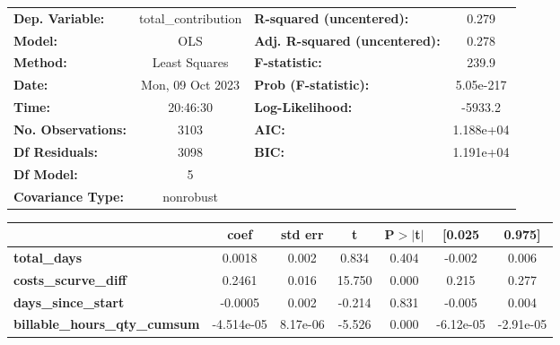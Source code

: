 \begin{center}
\begin{tabular}{lclc}
\toprule
\textbf{Dep. Variable:}               & total\_contribution & \textbf{  R-squared (uncentered):}      &     0.279   \\
\textbf{Model:}                       &         OLS         & \textbf{  Adj. R-squared (uncentered):} &     0.278   \\
\textbf{Method:}                      &    Least Squares    & \textbf{  F-statistic:       }          &     239.9   \\
\textbf{Date:}                        &   Mon, 09 Oct 2023  & \textbf{  Prob (F-statistic):}          & 5.05e-217   \\
\textbf{Time:}                        &       20:46:30      & \textbf{  Log-Likelihood:    }          &   -5933.2   \\
\textbf{No. Observations:}            &          3103       & \textbf{  AIC:               }          & 1.188e+04   \\
\textbf{Df Residuals:}                &          3098       & \textbf{  BIC:               }          & 1.191e+04   \\
\textbf{Df Model:}                    &             5       & \textbf{                     }          &             \\
\textbf{Covariance Type:}             &      nonrobust      & \textbf{                     }          &             \\
\bottomrule
\end{tabular}
\begin{tabular}{lcccccc}
                                      & \textbf{coef} & \textbf{std err} & \textbf{t} & \textbf{P$> |$t$|$} & \textbf{[0.025} & \textbf{0.975]}  \\
\midrule
\textbf{total\_days}                  &       0.0018  &        0.002     &     0.834  &         0.404        &       -0.002    &        0.006     \\
\textbf{costs\_scurve\_diff}          &       0.2461  &        0.016     &    15.750  &         0.000        &        0.215    &        0.277     \\
\textbf{days\_since\_start}           &      -0.0005  &        0.002     &    -0.214  &         0.831        &       -0.005    &        0.004     \\
\textbf{billable\_hours\_qty\_cumsum} &   -4.514e-05  &     8.17e-06     &    -5.526  &         0.000        &    -6.12e-05    &    -2.91e-05     \\

\end{tabular}
\end{center}
